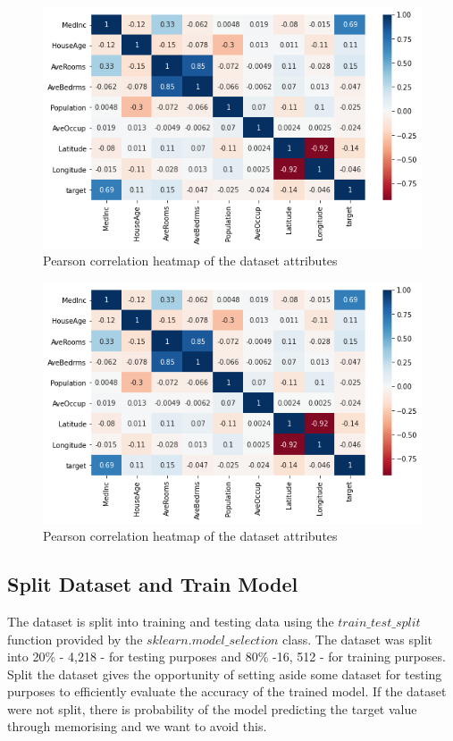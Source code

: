 \documentclass[conference]{IEEEtran}
\begin{document}
\begin{figure}[htbp]
	\centerline{\includegraphics [scale=0.5]{figures/heatmap_correlation.png}}
	\caption{Pearson correlation heatmap of the dataset attributes}
	\label{fig:correlation_heatmap}
\end{figure}

\begin{figure}[htbp]
	\centerline{\includegraphics [scale=0.5]{figures/heatmap_correlation.png}}
	\caption{Pearson correlation heatmap of the dataset attributes}
	\label{fig:correlation_heatmap}
\end{figure}


\subsection{Split Dataset and Train Model}
The dataset is split into training and testing data using the $train\_test\_split$ function provided by the $sklearn.model\_selection$ class. The dataset was split into 20\% - 4,218 - for testing purposes and 80\% -16, 512 - for training purposes. Split the dataset gives the opportunity of setting aside some dataset for testing purposes to efficiently evaluate the accuracy of the trained model. If the dataset were not split, there is probability of the model predicting the target value through memorising and we want to avoid this. 
\end{document}
